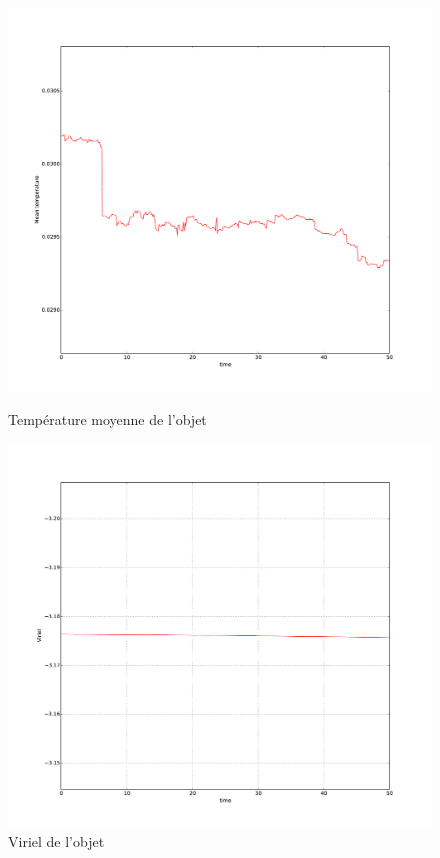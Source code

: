 	\begin{figure}
			\begin{minipage}[b]{0.40\linewidth}
				\centering \includegraphics[width=\textwidth]{graphe/test_simu_temp.pdf}
				\caption{Température moyenne de l'objet}
				\label{simu::graphe::temp}
			\end{minipage}\hfill
			\begin{minipage}[b]{0.48\linewidth}
				\centering \includegraphics[width=\textwidth]{graphe/test_simu.pdf}
				\caption{Viriel de l'objet}
				\label{simu::graphe::viriel}
			\end{minipage}
	\end{figure}

